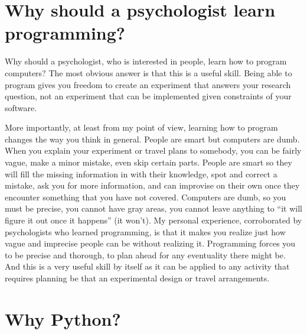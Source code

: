 \documentclass[
]{book}
\begin{document}
\hypertarget{why-should-a-psychologist-learn-programming}{%
\section{Why should a psychologist learn programming?}\label{why-should-a-psychologist-learn-programming}}

Why should a psychologist, who is interested in people, learn how to program computers? The most obvious answer is that this is a useful skill. Being able to program gives you freedom to create an experiment that answers your research question, not an experiment that can be implemented given constraints of your software.

More importantly, at least from my point of view, learning how to program changes the way you think in general. People are smart but computers are dumb. When you explain your experiment or travel plans to somebody, you can be fairly vague, make a minor mistake, even skip certain parts. People are smart so they will fill the missing information in with their knowledge, spot and correct a mistake, ask you for more information, and can improvise on their own once they encounter something that you have not covered. Computers are dumb, so you must be precise, you cannot have gray areas, you cannot leave anything to ``it will figure it out once it happens'' (it won't). My personal experience, corroborated by psychologists who learned programming, is that it makes you realize just how vague and imprecise people can be without realizing it. Programming forces you to be precise and thorough, to plan ahead for any eventuality there might be. And this is a very useful skill by itself as it can be applied to any activity that requires planning be that an experimental design or travel arrangements.

\hypertarget{why-python}{%
\section{Why Python?}\label{why-python}}
\end{document}

